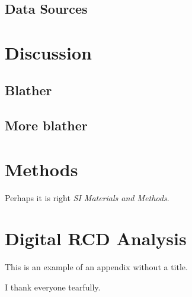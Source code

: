\documentclass{pnastwo}
\begin{document}
\begin{article}
\section{}


\subsection{Data Sources}

\section{Discussion}
\subsection{Blather}


\subsection{More blather}


\begin{materials}
\section{Methods} 
Perhaps it is right {\it SI Materials and Methods}.

\section{Digital RCD Analysis} 

\end{materials}

\appendix[App 1]

\appendix
This is an example of an appendix without a title.

\begin{acknowledgments}
I thank everyone tearfully. 
\end{acknowledgments}



\end{article}
\end{document}
